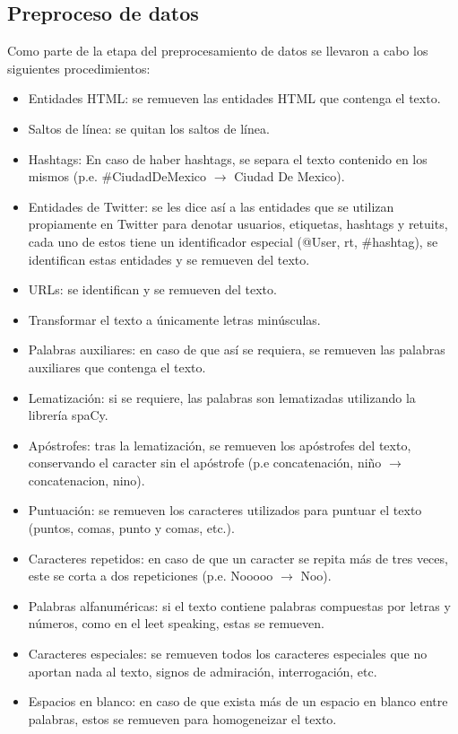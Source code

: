 \documentclass[a4paper]{llncs}
\begin{document}
\subsection{Preproceso de datos}
\label{sec:orgd5e7031}
\label{sec:preproceso}
Como parte de la etapa del preprocesamiento de datos se llevaron a cabo los
siguientes procedimientos:
\begin{itemize}
\item Entidades HTML: se remueven las entidades HTML que contenga el texto.
\item Saltos de línea: se quitan los saltos de línea.
\item Hashtags: En caso de haber hashtags, se separa el texto contenido en los
mismos (p.e. \#CiudadDeMexico \(\rightarrow\) Ciudad De Mexico).
\item Entidades de Twitter: se les dice así a las entidades que se utilizan
propiamente en Twitter para denotar usuarios, etiquetas, hashtags y retuits,
cada uno de estos tiene un identificador especial (@User, rt, \#hashtag), se
identifican estas entidades y se remueven del texto.
\item URLs: se identifican y se remueven del texto.
\item Transformar el texto a únicamente letras minúsculas.
\item Palabras auxiliares: en caso de que así se requiera, se remueven las palabras
auxiliares que contenga el texto.
\item Lematización: si se requiere, las palabras son lematizadas utilizando la
librería spaCy.
\item Apóstrofes: tras la lematización, se remueven los apóstrofes del texto,
conservando el caracter sin el apóstrofe (p.e concatenación, niño
\(\rightarrow\) concatenacion, nino).
\item Puntuación: se remueven los caracteres utilizados para puntuar el texto
(puntos, comas, punto y comas, etc.).
\item Caracteres repetidos: en caso de que un caracter se repita más de tres veces,
este se corta a dos repeticiones (p.e. Nooooo \(\rightarrow\) Noo).
\item Palabras alfanuméricas: si el texto contiene palabras compuestas por letras y
números, como en el leet speaking, estas se remueven.
\item Caracteres especiales: se remueven todos los caracteres especiales que no
aportan nada al texto, signos de admiración, interrogación, etc.
\item Espacios en blanco: en caso de que exista más de un espacio en blanco entre
palabras, estos se remueven para homogeneizar el texto.
\end{itemize}
\end{document}
